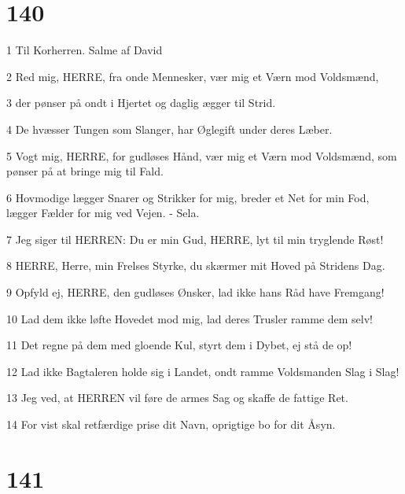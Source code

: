 \chapter{140}

\par 1 Til Korherren. Salme af David
\par 2 Red mig, HERRE, fra onde Mennesker, vær mig et Værn mod Voldsmænd,
\par 3 der pønser på ondt i Hjertet og daglig ægger til Strid.
\par 4 De hvæsser Tungen som Slanger, har Øglegift under deres Læber.
\par 5 Vogt mig, HERRE, for gudløses Hånd, vær mig et Værn mod Voldsmænd, som pønser på at bringe mig til Fald.
\par 6 Hovmodige lægger Snarer og Strikker for mig, breder et Net for min Fod, lægger Fælder for mig ved Vejen. - Sela.
\par 7 Jeg siger til HERREN: Du er min Gud, HERRE, lyt til min tryglende Røst!
\par 8 HERRE, Herre, min Frelses Styrke, du skærmer mit Hoved på Stridens Dag.
\par 9 Opfyld ej, HERRE, den gudløses Ønsker, lad ikke hans Råd have Fremgang!
\par 10 Lad dem ikke løfte Hovedet mod mig, lad deres Trusler ramme dem selv!
\par 11 Det regne på dem med gloende Kul, styrt dem i Dybet, ej stå de op!
\par 12 Lad ikke Bagtaleren holde sig i Landet, ondt ramme Voldsmanden Slag i Slag!
\par 13 Jeg ved, at HERREN vil føre de armes Sag og skaffe de fattige Ret.
\par 14 For vist skal retfærdige prise dit Navn, oprigtige bo for dit Åsyn.

\chapter{141}

